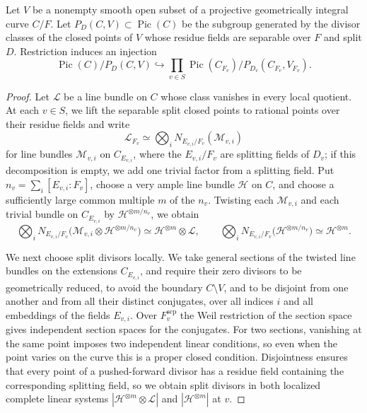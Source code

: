 \begin{proposition}\label{prop:paper-global-picard}
Let $V$ be a nonempty smooth open subset of a projective geometrically integral curve $C/F$.
Let $P_D(C,V)\subset\operatorname{Pic}(C)$ be the subgroup generated by the divisor classes of the closed points of $V$ whose residue fields are separable over $F$ and split $D$.
Restriction induces an injection
\[
 \operatorname{Pic}(C)/P_D(C,V)\hookrightarrow
 \prod_{v\in S}\operatorname{Pic}(C_{F_v})/P_{D_v}(C_{F_v},V_{F_v}).
\]
\end{proposition}
\begin{proof}
Let $\mathcal L$ be a line bundle on $C$ whose class vanishes in every local quotient.
At each $v\in S$, we lift the separable split closed points to rational points over their residue fields and write
\[
 \mathcal L_{F_v}\simeq\bigotimes_iN_{E_{v,i}/F_v}(\mathcal M_{v,i})
\]
for line bundles $\mathcal M_{v,i}$ on $C_{E_{v,i}}$, where the $E_{v,i}/F_v$ are splitting fields of $D_v$; if this decomposition is empty, we add one trivial factor from a splitting field.
Put $n_v=\sum_i[E_{v,i}:F_v]$, choose a very ample line bundle $\mathcal H$ on $C$, and choose a sufficiently large common multiple $m$ of the $n_v$.
Twisting each $\mathcal M_{v,i}$ and each trivial bundle on $C_{E_{v,i}}$ by $\mathcal H^{\otimes m/n_v}$, we obtain
\[
 \bigotimes_iN_{E_{v,i}/F_v}\bigl(\mathcal M_{v,i}\otimes\mathcal H^{\otimes m/n_v}\bigr)\simeq\mathcal H^{\otimes m}\otimes\mathcal L,
 \qquad
 \bigotimes_iN_{E_{v,i}/F_v}\bigl(\mathcal H^{\otimes m/n_v}\bigr)\simeq\mathcal H^{\otimes m}.
\]

We next choose split divisors locally.
We take general sections of the twisted line bundles on the extensions $C_{E_{v,i}}$, and require their zero divisors to be geometrically reduced, to avoid the boundary $C\setminus V$, and to be disjoint from one another and from all their distinct conjugates, over all indices $i$ and all embeddings of the fields $E_{v,i}$.
Over $F_v^{\mathrm{sep}}$ the Weil restriction of the section space gives independent section spaces for the conjugates.
For two sections, vanishing at the same point imposes two independent linear conditions, so even when the point varies on the curve this is a proper closed condition.
Disjointness ensures that every point of a pushed-forward divisor has a residue field containing the corresponding splitting field, so we obtain split divisors in both localized complete linear systems $|\mathcal H^{\otimes m}\otimes\mathcal L|$ and $|\mathcal H^{\otimes m}|$ at $v$.


\end{proof}
